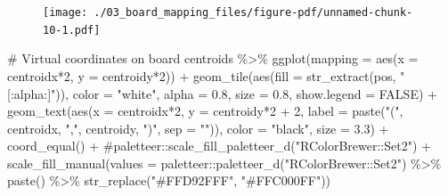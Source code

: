 \documentclass[
  letterpaper,
  DIV=11,
  numbers=noendperiod]{scrreprt}
\newenvironment{Shaded}{\begin{snugshade}}{\end{snugshade}}
\newcommand{\AttributeTok}[1]{\textcolor[rgb]{0.40,0.45,0.13}{#1}}
\newcommand{\CommentTok}[1]{\textcolor[rgb]{0.37,0.37,0.37}{#1}}
\newcommand{\ConstantTok}[1]{\textcolor[rgb]{0.56,0.35,0.01}{#1}}
\newcommand{\DecValTok}[1]{\textcolor[rgb]{0.68,0.00,0.00}{#1}}
\newcommand{\FloatTok}[1]{\textcolor[rgb]{0.68,0.00,0.00}{#1}}
\newcommand{\FunctionTok}[1]{\textcolor[rgb]{0.28,0.35,0.67}{#1}}
\newcommand{\NormalTok}[1]{\textcolor[rgb]{0.00,0.23,0.31}{#1}}
\newcommand{\SpecialCharTok}[1]{\textcolor[rgb]{0.37,0.37,0.37}{#1}}
\newcommand{\StringTok}[1]{\textcolor[rgb]{0.13,0.47,0.30}{#1}}
\begin{document}
\begin{figure}[H]

{\centering \texttt{[image: ./03\_board\_mapping\_files/figure-pdf/unnamed-chunk-10-1.pdf]}

}

\end{figure}

\begin{Shaded}
\begin{Highlighting}[]
\CommentTok{\# Virtual coordinates on board}
\NormalTok{centroids }\SpecialCharTok{\%\textgreater{}\%} 
  \FunctionTok{ggplot}\NormalTok{(}\AttributeTok{mapping =} \FunctionTok{aes}\NormalTok{(}\AttributeTok{x =}\NormalTok{ centroidx}\SpecialCharTok{*}\DecValTok{2}\NormalTok{, }\AttributeTok{y =}\NormalTok{ centroidy}\SpecialCharTok{*}\DecValTok{2}\NormalTok{)) }\SpecialCharTok{+}
  \FunctionTok{geom\_tile}\NormalTok{(}\FunctionTok{aes}\NormalTok{(}\AttributeTok{fill =} \FunctionTok{str\_extract}\NormalTok{(pos, }\StringTok{"[:alpha:]"}\NormalTok{)), }\AttributeTok{color =} \StringTok{"white"}\NormalTok{, }\AttributeTok{alpha =} \FloatTok{0.8}\NormalTok{, }\AttributeTok{size =} \FloatTok{0.8}\NormalTok{, }\AttributeTok{show.legend =} \ConstantTok{FALSE}\NormalTok{) }\SpecialCharTok{+}
  \FunctionTok{geom\_text}\NormalTok{(}\FunctionTok{aes}\NormalTok{(}\AttributeTok{x =}\NormalTok{ centroidx}\SpecialCharTok{*}\DecValTok{2}\NormalTok{, }\AttributeTok{y =}\NormalTok{ centroidy}\SpecialCharTok{*}\DecValTok{2} \SpecialCharTok{+} \DecValTok{2}\NormalTok{, }\AttributeTok{label =} \FunctionTok{paste}\NormalTok{(}\StringTok{"("}\NormalTok{, centroidx, }\StringTok{","}\NormalTok{, centroidy, }\StringTok{")"}\NormalTok{, }\AttributeTok{sep =} \StringTok{""}\NormalTok{)), }\AttributeTok{color =} \StringTok{"black"}\NormalTok{, }\AttributeTok{size =} \FloatTok{3.3}\NormalTok{) }\SpecialCharTok{+}
  \FunctionTok{coord\_equal}\NormalTok{() }\SpecialCharTok{+}
  \CommentTok{\#paletteer::scale\_fill\_paletteer\_d("RColorBrewer::Set2") +}
  \FunctionTok{scale\_fill\_manual}\NormalTok{(}\AttributeTok{values =}\NormalTok{ paletteer}\SpecialCharTok{::}\FunctionTok{paletteer\_d}\NormalTok{(}\StringTok{"RColorBrewer::Set2"}\NormalTok{) }\SpecialCharTok{\%\textgreater{}\%} \FunctionTok{paste}\NormalTok{() }\SpecialCharTok{\%\textgreater{}\%} \FunctionTok{str\_replace}\NormalTok{(}\StringTok{"\#FFD92FFF"}\NormalTok{, }\StringTok{"\#FFC000FF"}\NormalTok{))}
\end{Highlighting}
\end{Shaded}
\end{document}
